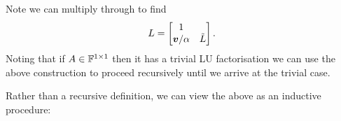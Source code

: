Note we can multiply through to find
\[
L = \begin{bmatrix}
1 \\
\bm{{\mbox{\boldmath$v$\unboldmath}}}/\alpha & \tilde{L} \end{bmatrix}.
\]
Noting that if $A \in {\mathbb F}^{1 \times 1}$ then it has a trivial LU factorisation we can use the above construction to proceed recursively until we arrive at the trivial case. 

Rather than a recursive definition, we can view the above as an inductive procedure:
